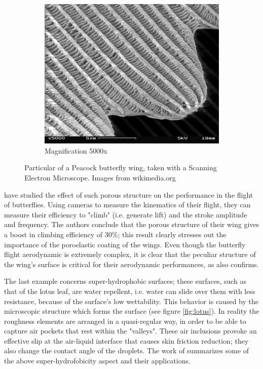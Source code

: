 \begin{figure}[h]
\begin{subfigure}[b]{0.3\textwidth}
	\end{subfigure}
	\begin{subfigure}[b]{0.3\textwidth}
		\includegraphics[width=\textwidth]{chapter_1/butterfly3}
		\caption{Magnification 5000x}
		\label{fig:b5000}
	\end{subfigure}
	\caption{Particular of a Peacock butterfly wing, taken with a Scanning Electron Microscope.  Images from wikimedia.org}
	\label{fig:butterfly}
\end{figure}

\citet{slegers2017beneficial} have studied the effect of such porous structure on the performance in the flight of butterflies.
Using cameras to measure the kinematics of their flight, they can measure their efficiency to "climb" (i.e. generate lift) and the stroke amplitude and frequency.
The authors conclude that the porous structure of their wing gives a boost in climbing efficiency of $30\%$; this result clearly stresses out the importance of the poroelastic coating of the wings. 
Even though the butterfly flight aerodynamic is extremely complex, it is clear that the peculiar structure of the wing's surface is critical for their aerodynamic performances, as also \citet{srygley2002unconventional} confirms.

The last example concerns super-hydrophobic surfaces; these surfaces, such as that of the lotus leaf, are water repellent, i.e. water can slide over them with less resistance, because of the surface's low wettability.
This behavior is caused by the microscopic structure which forms the surface (see figure \ref{fig:lotus}). In reality the roughness elements are arranged in a quasi-regular way, in order to be able to capture air pockets that rest within the "valleys". These air inclusions provoke an effective slip at the air-liquid interface that causes skin friction reduction; they also change the contact angle of the droplets. The work of \citet{bottaro2003effect} summarizes some of the above super-hydrofobicity aspect and their applications.

